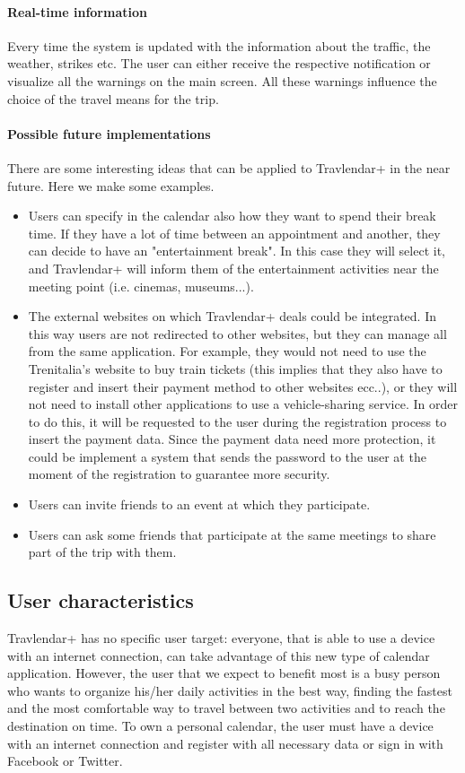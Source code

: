 \documentclass[12pt,titlepage]{article}
\begin{document}
\paragraph{Real-time information}
Every time the system is updated with the information about the traffic, the weather, strikes etc. The user can either receive the respective notification or visualize all the warnings on the main screen. All these warnings influence the choice of the travel means for the trip. 


\paragraph{Possible future implementations} 
There are some interesting ideas that can be applied to Travlendar+ in the near future. Here we make some examples.
\begin{itemize}
\item Users can specify in the calendar also how they want to spend their break time. If they have a lot of time between an appointment and another, they can decide to have an "entertainment break". In this case they will select it, and Travlendar+ will inform them of the entertainment activities near the meeting point (i.e. cinemas, museums...).
\item The external websites on which Travlendar+ deals could be integrated. In this way users are not redirected to other websites, but they can manage all from the same application. For example, they would not need to use the Trenitalia's website to buy train tickets (this implies that they also have to register and insert their payment method to other websites ecc..), or they will not need to install other applications to use a vehicle-sharing service.  In order to do this, it will be requested to the user during the registration process to insert the payment data. Since the payment data need more protection, it could be implement a system that sends the password to the user at the moment of the registration to guarantee more security. 
\item Users can invite friends to an event at which they participate.  
\item Users can ask some friends that participate at the same meetings to share part of the trip with them. 

\end{itemize}

\subsection{User characteristics}\label{sec:mod1}
Travlendar+ has no specific user target: everyone, that is able to use a device with an internet connection, can take advantage of this new type of calendar application.
However, the user that we expect to benefit most is a busy person who wants to organize his/her daily activities in the best way, finding the fastest and the most comfortable way to travel between two activities and to reach the destination on time.
To own a personal calendar, the user must have a device with an internet connection and register with all necessary data or sign in with Facebook or Twitter.
\end{document}
